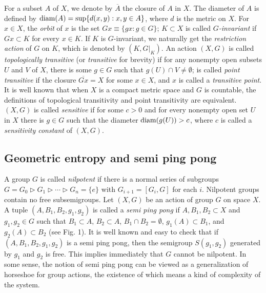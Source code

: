 \documentclass[12pt,a4paper]{amsart}
\theoremstyle{definition}
\numberwithin{equation}{section}
\begin{document}
For a subset $A$ of $X$, we denote by $\overline{A}$ the closure of $A$ in $X$. The diameter of $A$ is defined by ${\rm diam}(A)={\rm sup}\{d(x,y):x,y\in A\}$, where $d$ is the metric on $X$. For $x\in X$,  the {\it orbit} of $x$  is the set $Gx\equiv\{gx:g\in
G\}$; $K\subset X$ is called {\it $G$-invariant} if $Gx\subset K $ for every $x\in K$.
If $K$ is $G$-invariant, we naturally get the {\it restriction action} of $G$ on $K$,
which is denoted by $(K, G|_K)$. An action $(X, G)$ is called {\it topologically  transitive} (or {\it transitive} for brevity) if for any nonempty open subsets $U$ and $V$ of $X$, there is some $g\in G$ such that $g(U)\cap V\neq\emptyset$; is called {\it point transitive}
if the closure ${\overline{Gx}}=X$ for some $x\in X$, and $x$ is called a {\it transitive point}. It is well known that when $X$ is a compact metric space
and $G$ is countable, the definitions of topological transitivity and point transitivity are equivalent. $(X,G)$ is called {\it sensitive} if for some $c>0$ and
for every nonempty open set $U$ in $X$ there is $g\in G$ such that the diameter ${\rm diam}(g(U))>c$, where $c$ is called a {\it sensitivity constant} of $(X,G)$.

\subsection{Geometric entropy and semi ping pong}

A group $G$ is called {\it nilpotent} if there is a normal series of subgroups $G=G_0\rhd G_1\rhd \cdots\rhd G_n=\{e\}$ with $G_{i+1}=[G_i,G]$ for each $i$. Nilpotent groups contain no free subsemigroups. Let $(X, G)$ be an action of group $G$ on space $X$. A tuple $(A, B_1, B_2, g_1, g_2)$ is called a {\it semi ping pong} if $A, B_1, B_2\subset X$ and $g_1, g_2\in G$ such that $B_1\subset A$, $B_2\subset A$, $B_1\cap B_2=\emptyset$,
$g_1(A)\subset B_1$, and $g_2(A)\subset B_2$ (see Fig. 1). It is well known and easy to check that if $(A, B_1, B_2, g_1, g_2)$ is
a semi ping pong, then the semigroup $S(g_1, g_2)$ generated by $g_1$ and $g_2$ is free. This implies immediately that
$G$ cannot be nilpotent. In some sense, the notion of semi ping pong can be viewed as a generalization of horseshoe for
group actions, the existence of which means a kind of complexity of the system.
\end{document}
